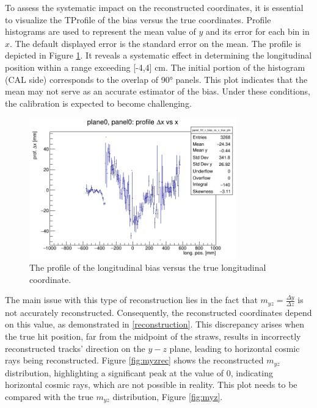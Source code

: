 To assess the systematic impact on the reconstructed coordinates, it is essential to visualize the TProfile of the bias versus the true coordinates. 
Profile histograms are used to represent the mean value of $y$ and its error for each bin in $x$. 
The default displayed error is the standard error on the mean. 
The profile is depicted in Figure \ref{fig:profile}. It reveals a systematic effect in determining the 
longitudinal position within a range exceeding [-4,4] cm. The initial portion of the histogram (CAL side) 
corresponds to the overlap of 90° panels. This plot indicates that the mean may not serve as an accurate estimator of the bias. 
Under these conditions, the calibration is expected to become challenging.
\begin{figure}[!h]
    \centering
    \includegraphics[width=0.8\textwidth]{figures/png/panel_00_x_bias_vs_x_prof.png}
    \caption[The profile of the longitudinal bias versus the true longitudinal coordinate.]{The profile of the longitudinal bias versus the true longitudinal coordinate.}
    \label{fig:profile}
\end{figure}
The main issue with this type of reconstruction lies in the fact that $m_{yz}=\frac{\Delta y}{\Delta z}$ 
is not accurately reconstructed. Consequently, the reconstructed coordinates depend on this value, as demonstrated in \ref{reconstruction}. 
This discrepancy arises when the true hit position, far from the midpoint of the straws, results in incorrectly reconstructed tracks'
direction on the $y-z$ plane, leading to horizontal cosmic rays being reconstructed. 
Figure \ref{fig:myzrec} shows the reconstructed $m_{yz}$ distribution, highlighting a significant peak at the value of 0, 
indicating horizontal cosmic rays, which are not possible in reality. This plot needs to be compared with the true $m_{yz}$ distribution, Figure \ref{fig:myz}.


